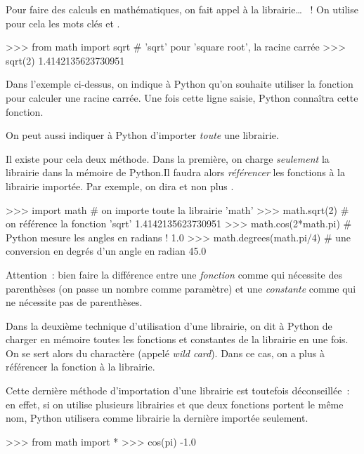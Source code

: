 Pour faire des calculs en mathématiques, on fait appel à la librairie\dots{} ~!
On utilise pour cela les mots clés  et .

\begin{pythoncode}
>>> from math import sqrt      # 'sqrt' pour 'square root', la racine carrée
>>> sqrt(2)
1.4142135623730951
\end{pythoncode}
Dans l'exemple ci-dessus, on indique à Python qu'on souhaite utiliser la fonction  pour
calculer une racine carrée. Une fois cette ligne saisie, Python connaîtra cette fonction.

On peut aussi indiquer à Python d'importer \textit{toute} une librairie.

Il existe pour cela deux méthode. Dans la première, on charge \textit{seulement} la librairie
dans la mémoire de Python.Il faudra alors \textit{référencer}
les fonctions à la librairie importée. Par exemple, on dira  et non plus .

\begin{pythoncode}
>>> import math              # on importe toute la librairie 'math'
>>> math.sqrt(2)             # on référence la fonction 'sqrt'
1.4142135623730951
>>> math.cos(2*math.pi)      # Python mesure les angles en radians !
1.0
>>> math.degrees(math.pi/4)  # une conversion en degrés d'un angle en radian
45.0
\end{pythoncode}


\begin{remarque}
Attention~: bien faire la différence entre une \textit{fonction} comme 
qui nécessite des parenthèses (on passe un nombre comme paramètre) et une \textit{constante}
comme  qui ne nécessite pas de parenthèses.
\end{remarque}

Dans la deuxième technique d'utilisation d'une librairie, on dit à Python de charger en mémoire
toutes les fonctions et constantes de la  librairie en une fois. On se sert alors du charactère
\motcle{*} (appelé \textit{wild card}). Dans ce cas, on a plus à référencer la fonction à la librairie.

Cette dernière méthode d'importation d'une librairie est toutefois déconseillée~:
en effet, si on utilise plusieurs librairies et que deux fonctions portent
le même nom, Python utilisera comme librairie la dernière importée seulement.

\begin{pythoncode}
>>> from math import *
>>> cos(pi)
-1.0
\end{pythoncode}

